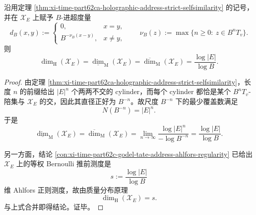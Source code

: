 \begin{theorem}\label{thm:xi-time-part62ca-holographic-address-exact-dimension}
沿用定理 \ref{thm:xi-time-part62ca-holographic-address-strict-selfsimilarity} 的记号，并在 \(\mathcal X_E\) 上赋予 \(B\)-进超度量
\[
d_B(x,y):=
\begin{cases}
0,& x=y,\\[2pt]
B^{-\nu_B(x-y)},& x\neq y,
\end{cases}
\qquad
\nu_B(z):=\max\{n\ge 0:\ z\in B^nT_v\}.
\]
则
\[
\dim_{\mathrm H}(\mathcal X_E)
=
\underline{\dim}_{\mathrm M}(\mathcal X_E)
=
\overline{\dim}_{\mathrm M}(\mathcal X_E)
=
\frac{\log |E|}{\log B}.
\]
\end{theorem}
\begin{proof}
由定理 \ref{thm:xi-time-part62ca-holographic-address-strict-selfsimilarity}，长度 \(n\) 的前缀给出 \(|E|^n\) 个两两不交的 cylinder，而每个 cylinder 都恰是某个 \(B^nT_v\)-陪集与 \(\mathcal X_E\) 的交，因此其直径正好为 \(B^{-n}\)。故尺度 \(B^{-n}\) 下的最少覆盖数满足
\[
N(B^{-n})=|E|^n.
\]
于是
\[
\underline{\dim}_{\mathrm M}(\mathcal X_E)
=
\overline{\dim}_{\mathrm M}(\mathcal X_E)
=
\lim_{n\to\infty}\frac{\log |E|^n}{-\log B^{-n}}
=
\frac{\log |E|}{\log B}.
\]

另一方面，结论 \ref{con:xi-time-part62c-godel-tate-address-ahlfors-regularity} 已给出 \(\mathcal X_E\) 上的等权 Bernoulli 推前测度是
\[
s:=\frac{\log |E|}{\log B}
\]
维 Ahlfors 正则测度，故由质量分布原理
\[
\dim_{\mathrm H}(\mathcal X_E)=s.
\]
与上式合并即得结论。证毕。
\end{proof}


